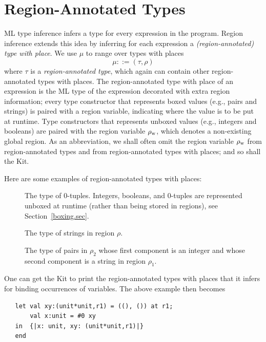 \documentclass[12pt]{book}
\newcommand{\rhoword}{\rho_{\rm w}}
\begin{document}
\section{Region-Annotated Types}
\label{reganntypes.sec}
ML type inference infers a type for every expression in the program.
Region inference extends this idea by inferring for each expression a
%
%
{\em (region-annotated) type with place}. We use $\mu$ to range over
types with places
$$\mu::=(\tau,\rho)$$
where $\tau$ is a {\em region-annotated type},
which again can contain other region-annotated types with places. The
region-annotated type with place of an expression is the ML type of
the expression decorated with extra region information; every type
constructor that represents boxed values (e.g., pairs and strings) is
paired with a region variable, indicating where the value is to be put
at runtime. Type constructors that represents unboxed values (e.g.,
integers and booleans) are paired with the region variable 
\index{$\rhoword$}%
$\rhoword$, which denotes a non-existing global region.
%
%
%
As an abbreviation, we shall often omit the region variable $\rhoword$
from region-annotated types and from region-annotated types with
places; and so shall the Kit.

Here are some examples of region-annotated types with places:
\begin{description}
\item[] The type of 0-tuples.  Integers,
  booleans, and 0-tuples are represented 
  unboxed at runtime (rather than being stored in regions), see
  Section~\ref{boxing.sec}.
\item[] The type of strings in region
  $\rho$.
\item[] The type of pairs in $\rho_2$ whose first
  component is an integer and whose second component is a string in
  region $\rho_1$.
\end{description}

One can get the Kit to print the region-annotated types with places
that it infers for binding occurrences of variables.  The above
example then becomes
\begin{verbatim}
   let val xy:(unit*unit,r1) = ((), ()) at r1; 
       val x:unit = #0 xy
   in  {|x: unit, xy: (unit*unit,r1)|}
   end 
\end{verbatim}
\end{document}
